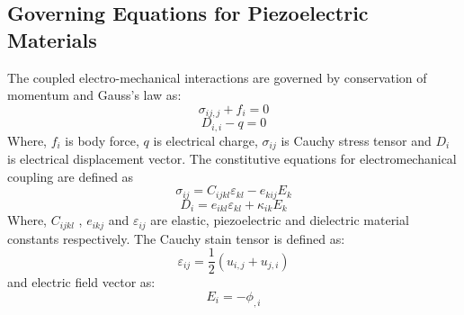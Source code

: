 \documentclass[11pt]{article}
\begin{document}
\subsection{Governing Equations for Piezoelectric Materials}
The coupled electro-mechanical interactions are governed by conservation of
momentum and Gauss's law as:
\begin{equation} \label{MechEq}
\sigma_{ij,j} + f_i = 0
\end{equation} 
\begin{equation} \label{ElecEq}
D_{i,i} - q = 0
\end{equation}
Where, $ f_i $ is body force, $ q $ is electrical charge, $ \sigma_{ij} $ is
Cauchy stress tensor and $ D_i $ is electrical displacement vector.
The constitutive equations for electromechanical coupling are defined as
\begin{equation}
\sigma_{ij} = C_{ijkl} \varepsilon_{kl} - e_{kij} E_k
\end{equation}
\begin{equation}
D_i = e_{ikl} \varepsilon_{kl} + \kappa_{ik} E_k
\end{equation}
Where, $ C_{ijkl} $ , $ e_{ikj} $ and $ \varepsilon_{ij} $ are elastic,
piezoelectric and dielectric material constants respectively. The Cauchy stain
tensor is defined as:
\begin{equation}
\varepsilon_{ij} = \frac{1}{2} (u_{i,j} + u_{j,i})
\end{equation}
and electric field vector as:
\begin{equation}
E_i = -\phi_{,i}
\end{equation}
\end{document}
